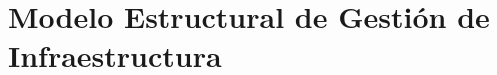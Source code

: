 \section{Modelo Estructural de Gestión de Infraestructura}

\begin{figure}[hbtp!]
	\begin{center}
	\end{center}
\end{figure}




